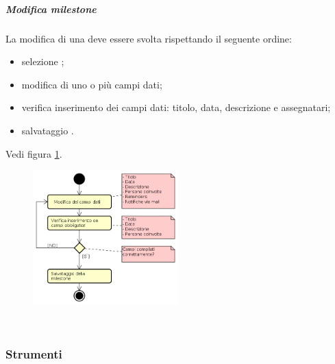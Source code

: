             \subparagraph{Modifica milestone}\label{sec:modificamilestone}
			La modifica di una  deve essere svolta rispettando il seguente ordine:
    			\begin{itemize}
    				\item selezione ;
    				\item modifica di uno o più campi dati;
    				\item verifica inserimento dei campi dati: titolo, data, descrizione e assegnatari;
    				\item salvataggio .
    			\end{itemize}
                Vedi figura \ref{fig:procmodmilestone}.
        		\begin{figure}[h!]
                    \centering
        			\includegraphics[width=0.5\textwidth]{img/proc_mod_milestone}
                    \label{fig:procmodmilestone}
        		\end{figure}\mbox{}\\
        \subsubsection{Strumenti}
